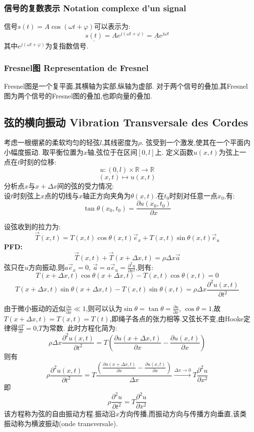 \documentclass[12pt, a4paper, oneside]{ctexbook}
\newcommand{\di }{\text{d}}%
\newcommand{\pian }{\partial}%
\newcommand{\R }{\mathbb{R}}%
\newcommand{\e }{\vec{e}}%
\newcommand{\x }{$x$}\newcommand{\xo }{$x_0$}
\begin{document}
\subsubsection{信号的复数表示 Notation complexe d'un signal}
信号$s(t)=A\cos(\omega t+\varphi)$可以表示为:
$$
  \underline{s(t)}=Ae^{j(\omega t+\varphi)}=\underline{A}e^{j\omega t}
$$
其中$e^{j(\omega t+\varphi)}$为复指数信号.
\subsubsection{Fresnel图 Representation de Fresnel}
Fresnel图是一个复平面,其横轴为实部,纵轴为虚部.
对于两个信号的叠加,其Fresnel图为两个信号的Fresnel图的叠加,也即向量的叠加.
\subsection{弦的横向振动 Vibration Transversale des Cordes}
考虑一根绷紧的柔软均匀的轻弦$l$,其线密度为$\rho$.
弦受到一个激发,使其在一个平面内小幅度振动.
取平衡位置为\x 轴,弦位于在区间$[0,l]$上.
定义函数$u(x,t)$为弦上一点在$t$时刻的位移:
$$
  u:(0,l)\times \R\rightarrow \R
$$
$$
  (x,t)\mapsto u(x,t)
$$
分析点\x 与$x+\Delta x$间的弦的受力情况:\\

设$t$时刻弦上\x 点的切线与\x 轴正方向夹角为$\theta(x,t)$.在$t_0$时刻对任意一点\xo,有:
$$
  \tan\theta(x_0,t_0)=\frac{\pian u(x_0,t_0)}{\pian x}
$$

设弦收到的拉力为:
$$
\vec{T}(x,t)=T(x,t)\cos\theta(x,t)\e_x+T(x,t)\sin\theta(x,t)\e_u
$$
\textbf{PFD:}
$$
  \vec{T}(x,t)+\vec{T}(x+\Delta x,t)=\rho \Delta x \vec{a}
$$
弦只在$u$方向振动,则$a\e_x=0$, $\vec{a}=a\e_u=\frac{\pian^2 u}{\pian x^2}$,则有:
$$
  T(x+\Delta x,t)\cos\theta(x+\Delta x,t)-T(x,t)\cos\theta(x,t)=0
$$
$$
  T(x+\Delta x,t)\sin\theta(x+\Delta x,t)-T(x,t)\sin\theta(x,t)=\rho\Delta x\frac{\pian^2 u(x,t)}{\pian t^2}
$$

由于微小振动的近似$\frac{\pian u}{\pian x}\ll 1$,则可以认为$\sin\theta =\tan\theta=\frac{\pian u}{\pian x}$,
$\cos\theta=1$,故$T(x+\Delta x,t)=T(x,t)=T(t)$,即绳子各点的张力相等.又弦长不变,由Hooke定律得$\frac{\di T}{\di t}=0$,$T$为常数.
此时方程化简为:
$$
  \rho\Delta x\frac{\pian^2 u(x,t)}{\pian t^2}=T(\frac{\pian u(x+\Delta x,t)}{\pian x}-\frac{\pian u(x,t)}{\pian x})
$$
则有
$$
\rho\frac{\pian^2 u(x,t)}{\pian t^2}=T\frac{(\frac{\pian u(x+\Delta x,t)}{\pian x}-\frac{\pian u(x,t)}{\pian x})}{\Delta x}\xrightarrow{\Delta x\rightarrow 0}T\frac{\pian^2 u}{\pian x^2}
$$
即
$$ 
  \rho\frac{\pian^2 u}{\pian t^2}=T\frac{\pian^2 u}{\pian x^2}
$$
该方程称为弦的自由振动方程.振动沿\x 方向传播,而振动方向与传播方向垂直,该类振动称为横波振动(onde transversale).
\end{document}
